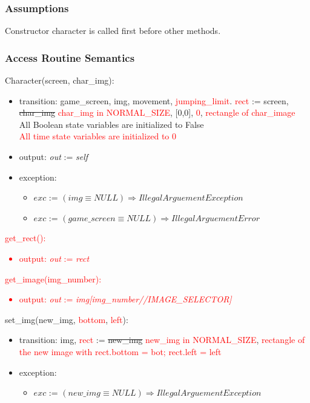 \documentclass[12pt]{article}
\begin{document}
\subsubsection* {Assumptions}

Constructor character is called first before other methods.

\subsubsection* {Access Routine Semantics}

\noindent Character(screen, char\_img):
\begin{itemize}
\item transition: game\_screen, img, movement, \textcolor{red}{jumping\_limit}. \textcolor{red}{rect} := screen, \sout{char\_img} \textcolor{red}{char\_img in NORMAL\_SIZE}, [0,0], \textcolor{red}{0}, \textcolor{red}{rectangle of char\_image}\\ All Boolean state variables are initialized to False\\
\textcolor{red}{All time state variables are initialized to 0}\\
\item output: \textit{out} := \textit{self}
\item exception: 
    \begin{itemize}[]
        \item $exc$ := $(img \equiv NULL) \Rightarrow IllegalArguementException$
        \item $exc$ := $(game\_screen \equiv NULL) \Rightarrow IllegalArguementError$
    \end{itemize}
\end{itemize}

\noindent \textcolor{red}{get\_rect():
\begin{itemize}
\item output: \textit{out} := \textit{rect}
\end{itemize}}

\noindent \textcolor{red}{get\_image(img\_number):
\begin{itemize}
\item output: \textit{out} := \textit{img[img\_number//IMAGE\_SELECTOR]}
\end{itemize}}

\noindent set\_img(new\_img, \textcolor{red}{ bottom}, \textcolor{red}{left}):
\begin{itemize}
    \item transition: img, \textcolor{red}{rect} := \sout{new\_img} \textcolor{red}{new\_img in NORMAL\_SIZE}, \textcolor{red}{rectangle of the new image with rect.bottom = bot; rect.left = left}
\item exception: 
    \begin{itemize}[]
        \item $exc$ := $(new\_img \equiv NULL) \Rightarrow IllegalArguementException$
    \end{itemize}    
\end{itemize}
\end{document}
